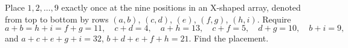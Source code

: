 Place $1,2,\ldots,9$ exactly once at the nine positions in an X-shaped array, denoted from top to bottom by rows $(a,b)$, $(c,d)$, $(e)$, $(f,g)$, $(h,i)$. Require
\[a+b=h+i=f+g=11,\quad c+d=4,\quad a+h=13,\quad c+f=5,\quad d+g=10,\quad b+i=9,\]
and $a+c+e+g+i=32$, $b+d+e+f+h=21$. Find the placement.
